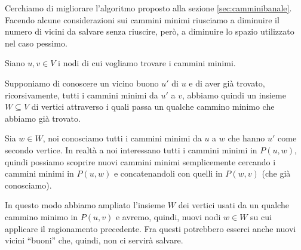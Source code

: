 \documentclass[a4paper,10pt]{amsbook}
\theoremstyle{plain}
\theoremstyle{definition}
\theoremstyle{remark}
\begin{document}
Cerchiamo di migliorare l'algoritmo proposto alla sezione
\ref{sec:camminibanale}. Facendo alcune considerazioni sui cammini
minimi riusciamo a diminuire il numero di vicini da salvare senza
riuscire, per\`o, a diminuire lo spazio utilizzato nel caso pessimo.

Siano $u,v\in V$ i nodi di cui vogliamo trovare i cammini minimi.

Supponiamo di conoscere un vicino buono $u'$ di $u$ e di aver gi\`a
trovato, ricorsivamente, tutti i cammini minimi da $u'$ a $v$, abbiamo
quindi un insieme $W \subseteq V$ di vertici attraverso i quali passa
un qualche cammino minimo che abbiamo gi\`a trovato.

Sia $w \in W$, noi conosciamo tutti i cammini minimi da $u$ a $w$ che
hanno $u'$ come secondo vertice. In realt\`a a noi interessano tutti i
cammini minimi in $P(u,w)$, quindi possiamo scoprire nuovi cammini
minimi semplicemente cercando i cammini minimi in $P(u,w)$ e
concatenandoli con quelli in $P(w,v)$ (che gi\`a conosciamo).

In questo modo abbiamo ampliato l'insieme $W$ dei vertici usati da un
qualche cammino minimo in $P(u,v)$ e avremo, quindi, nuovi nodi $w\in
W$ su cui applicare il ragionamento precedente. Fra questi potrebbero
esserci anche nuovi vicini ``buoni'' che, quindi, non ci servir\`a
salvare.
\end{document}
